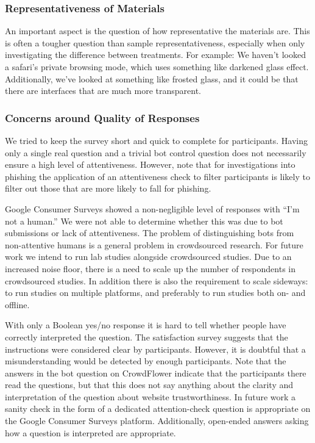 \documentclass[twoside,letterpaper]{soups}
\begin{document}
\subsubsection{Representativeness of Materials}

An important aspect is the question of how representative the materials are. This is often a tougher question than sample representativeness, especially when only investigating the difference between treatments. For example: We haven't looked a safari's private browsing mode, which uses something like darkened glass effect. Additionally, we've looked at something like frosted glass, and it could be that there are interfaces that are much more transparent.

\subsubsection{Concerns around Quality of Responses}

We tried to keep the survey short and quick to complete for participants. Having only a single real question and a trivial bot control question does not necessarily ensure a high level of attentiveness. However, note that for investigations into phishing the application of an attentiveness check to filter participants is likely to filter out those that are more likely to fall for phishing.

Google Consumer Surveys showed a non-negligible level of responses with ``I'm not a human.'' We were not able to determine whether this was due to bot submissions or lack of attentiveness. The problem of distinguishing bots from non-attentive humans is a general problem in crowdsourced research. For future work we intend to run lab studies alongside crowdsourced studies. Due to an increased noise floor, there is a need to scale up the number of respondents in crowdsourced studies. In addition there is also the requirement to scale sideways: to run studies on multiple platforms, and preferably to run studies both on- and offline.

With only a Boolean yes/no response it is hard to tell whether people have correctly interpreted the question. The satisfaction survey suggests that the instructions were considered clear by participants. However, it is doubtful that a misunderstanding would be detected by enough participants. Note that the answers in the bot question on CrowdFlower indicate that the participants there read the questions, but that this does not say anything about the clarity and interpretation of the question about website trustworthiness. In future work a sanity check in the form of a dedicated attention-check question is appropriate on the Google Consumer Surveys platform. Additionally, open-ended answers asking how a question is interpreted are appropriate.
\end{document}
